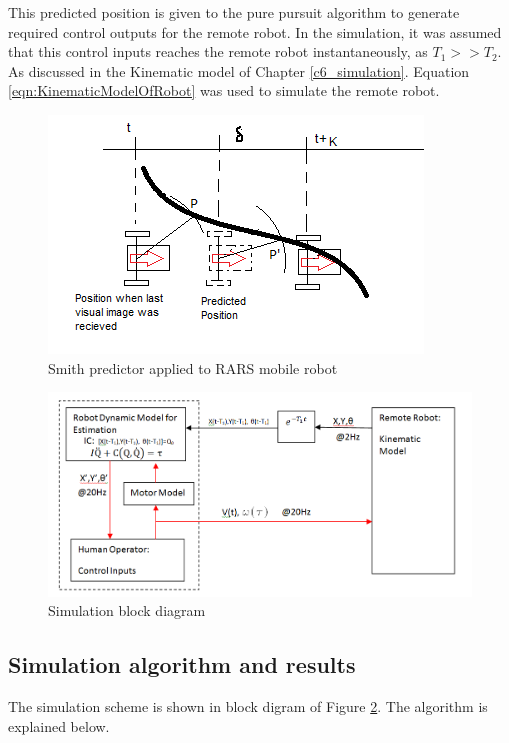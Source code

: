 This predicted position is given to the pure pursuit algorithm to generate required control outputs for the remote robot. In the simulation, it was assumed that this control inputs reaches the remote robot instantaneously, as $T_1>> T_2$. As discussed in the   Kinematic model of Chapter \ref{c6_simulation}. Equation \ref{eqn:KinematicModelOfRobot} was used to simulate the remote robot.
 \begin{figure}
	\includegraphics[width=.8\linewidth]{Chapter7/fig/robotPredictPos}
	\caption{Smith predictor applied to RARS mobile robot}
	\label{fig:SmithRobot}
\end{figure}
 \begin{figure}
	\includegraphics[width=\linewidth]{Chapter7/fig/Sumilation_BlkDgm}
	\caption{Simulation block diagram}
	\label{fig:SimBlock}
\end{figure}
\subsection{Simulation algorithm and  results} 
The simulation scheme is  shown in block digram of Figure \ref{fig:SimBlock}. The algorithm  is explained  below.

